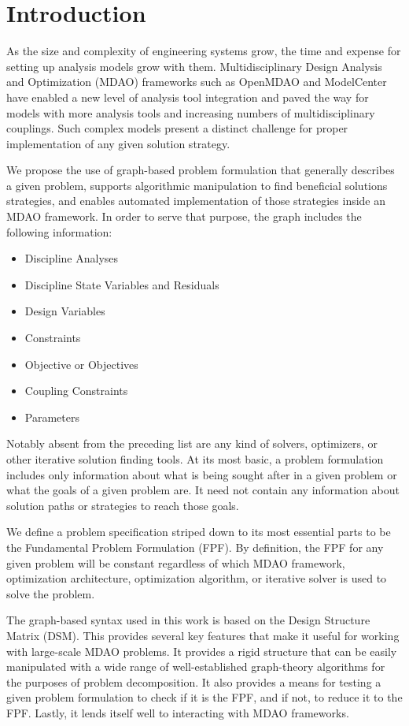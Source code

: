 \section{Introduction}
    
    As the size and complexity of engineering systems grow, the time and expense for setting up 
    analysis models grow with them. Multidisciplinary Design Analysis and Optimization (MDAO)
    frameworks such as OpenMDAO\cite{Gray2012} and ModelCenter have enabled a new level of analysis tool integration 
    and paved the way for models with more analysis tools and increasing numbers of multidisciplinary couplings. 
    Such complex models present a distinct challenge for proper implementation of any given solution strategy. 
    
    We propose the use of graph-based problem formulation that generally describes a
    given problem, supports algorithmic manipulation to find beneficial solutions strategies, and enables automated 
    implementation of those strategies inside an MDAO framework. In order to serve that purpose, the graph includes the following information: 
    \begin{itemize}
       \item Discipline Analyses 
       \item Discipline State Variables and Residuals
       \item Design Variables
       \item Constraints
       \item Objective or Objectives
       \item Coupling Constraints
       \item Parameters
    \end{itemize}
    Notably absent from the preceding list are any kind of solvers, optimizers, or other iterative solution finding tools. 
    At its most basic, a problem formulation includes only information about what is being sought after in a given problem or what the
    goals of a given problem are. It need not contain any information about solution paths or strategies to reach those goals. 

    We define a problem specification striped down to its most essential parts to be the 
    Fundamental Problem Formulation (FPF). By definition, the FPF for any given problem will be constant regardless 
    of which MDAO framework, optimization architecture, optimization algorithm, or iterative solver is used to solve the problem.

    The graph-based syntax used in this work is based on the Design Structure Matrix (DSM). 
    This provides several key features that make it useful for working with large-scale MDAO problems. 
    It provides a rigid structure that can be easily manipulated with a wide range of well-established graph-theory algorithms 
    for the purposes of problem decomposition. It also provides a means for testing a given 
    problem formulation to check if it is the FPF, and if not, to reduce it to the FPF. Lastly, it lends itself 
    well to interacting with MDAO frameworks. 

